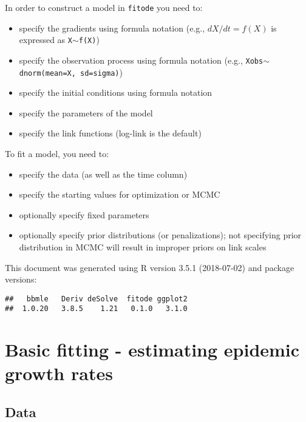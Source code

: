 \documentclass{article}\usepackage[]{graphicx}\usepackage[]{color}
\makeatletter
\newenvironment{kframe}{%
 \def\at@end@of@kframe{}%
 \ifinner\ifhmode%
  \def\at@end@of@kframe{\end{minipage}}%
  \begin{minipage}{\columnwidth}%
 \fi\fi%
 \def\FrameCommand##1{\hskip\@totalleftmargin \hskip-\fboxsep
 \colorbox{shadecolor}{##1}\hskip-\fboxsep
     \hskip-\linewidth \hskip-\@totalleftmargin \hskip\columnwidth}%
 \MakeFramed {\advance\hsize-\width
   \@totalleftmargin\z@ \linewidth\hsize
   \@setminipage}}%
 {\par\unskip\endMakeFramed%
 \at@end@of@kframe}
\newenvironment{knitrout}{}{} %
\makeatother
\begin{document}
In order to construct a model in \texttt{fitode} you need to:
\begin{itemize}
    \item specify the gradients using formula notation (e.g., $dX/dt=f(X)$ is
            expressed as \texttt{X$\sim$f(X)})
    \item specify the observation process using formula notation (e.g.,
            \texttt{Xobs$\sim$dnorm(mean=X, sd=sigma)})
    \item specify the initial conditions using formula notation
    \item specify the parameters of the model
    \item specify the link functions (log-link is the default)
\end{itemize}
To fit a model, you need to:
\begin{itemize}
    \item specify the data (as well as the time column)
    \item specify the starting values for optimization or MCMC
    \item optionally specify fixed parameters
    \item optionally specify prior distributions (or penalizations); not
            specifying prior distribution in MCMC will result in improper priors on link scales
\end{itemize}
This document was generated using R version 3.5.1 (2018-07-02) and package versions:
\begin{knitrout}
\color{fgcolor}\begin{kframe}
\begin{verbatim}
##   bbmle   Deriv deSolve  fitode ggplot2 
##  1.0.20   3.8.5    1.21   0.1.0   3.1.0
\end{verbatim}
\end{kframe}
\end{knitrout}

\section{Basic fitting - estimating epidemic growth rates}

\subsection{Data}
\end{document}

